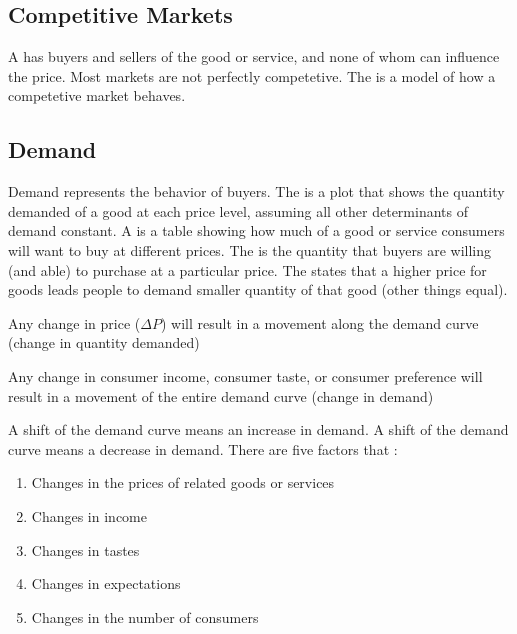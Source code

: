 \documentclass{article}
\begin{document}
\subsection{Competitive Markets}

A  has  buyers and sellers of the  good or service, and none of whom can influence the price. Most markets are not perfectly competetive. The  is a model of how a competetive market behaves. 

\subsection{Demand}

Demand represents the behavior of buyers. The  is a plot that shows the quantity demanded of a good at each price level, assuming all other determinants of demand constant. A  is a table showing how much of a good or service consumers will want to buy at different prices. The  is the quantity that buyers are willing (and able) to purchase at a particular price. The  states that a higher price for goods leads people to demand smaller quantity of that good (other things equal). 

\begin{remark}
  Any change in price ($\Delta P$) will result in a movement along the demand curve (change in quantity demanded)
\end{remark}

\begin{remark}
  Any change in consumer income, consumer taste, or consumer preference will result in a movement of the entire demand curve (change in demand)
\end{remark}

A  shift of the demand curve means an increase in demand. A  shift of the demand curve means a decrease in demand. There are five factors that :
\begin{enumerate}
  \item Changes in the prices of related goods or services
  \item Changes in income 
  \item Changes in tastes 
  \item Changes in expectations 
  \item Changes in the number of consumers
\end{enumerate}
\end{document}
